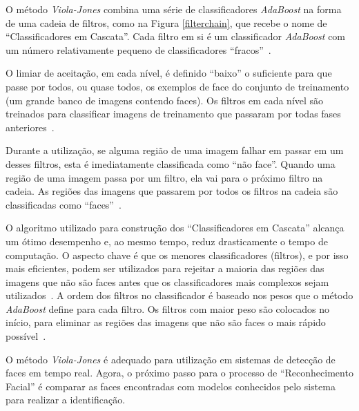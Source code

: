 O método \textit{Viola-Jones} combina uma série de classificadores \textit{AdaBoost} na forma de uma cadeia de filtros, como na Figura \ref{filterchain}, que recebe o nome de ``Classificadores em Cascata''. Cada filtro em si é um classificador \textit{AdaBoost} com um número relativamente pequeno de classificadores ``fracos''~\cite{servodetection}. 

O limiar de aceitação, em cada nível, é definido ``baixo'' o suficiente para que passe por todos, ou quase todos, os exemplos de face do conjunto de treinamento (um grande banco de imagens contendo faces). Os filtros em cada nível são treinados para classificar imagens de treinamento que passaram por todas fases anteriores~\cite{servodetection}.

Durante a utilização, se alguma região de uma imagem falhar em passar em um desses filtros, esta é imediatamente classificada como ``não face''. Quando uma região de uma imagem passa por um filtro, ela vai para o próximo filtro na cadeia. As regiões das imagens que passarem por todos os filtros na cadeia são classificadas como ``faces''~\cite{servodetection}.

O algoritmo utilizado para construção dos ``Classificadores em Cascata'' alcança um ótimo desempenho e, ao mesmo tempo, reduz drasticamente o tempo de computação. O aspecto chave é que os menores classificadores (filtros), e por isso mais eficientes, podem ser utilizados para rejeitar a maioria das regiões das imagens que não são faces antes que os classificadores mais complexos sejam utilizados~\cite{violajones}. A ordem dos filtros no classificador é baseado nos pesos que o método \textit{AdaBoost} define para cada filtro. Os filtros com maior peso são colocados no início, para eliminar as regiões das imagens que não são faces o mais rápido possível~\cite{servodetection}. 

O método \textit{Viola-Jones} é adequado para utilização em sistemas de detecção de faces em tempo real. Agora, o próximo passo para o processo de ``Reconhecimento Facial'' é comparar as faces encontradas com modelos conhecidos pelo sistema para realizar a identificação.


